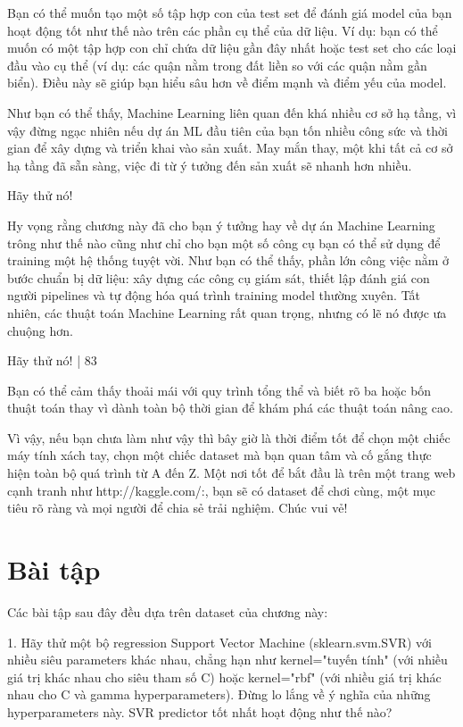 Bạn có thể muốn tạo một số tập hợp con của test set để đánh giá model của bạn hoạt động tốt như thế nào trên các phần cụ thể của dữ liệu. Ví dụ: bạn có thể muốn có một tập hợp con chỉ chứa dữ liệu gần đây nhất hoặc test set cho các loại đầu vào cụ thể (ví dụ: các quận nằm trong đất liền so với các quận nằm gần biển). Điều này sẽ giúp bạn hiểu sâu hơn về điểm mạnh và điểm yếu của model.

Như bạn có thể thấy, Machine Learning liên quan đến khá nhiều cơ sở hạ tầng, vì vậy đừng ngạc nhiên nếu dự án ML đầu tiên của bạn tốn nhiều công sức và thời gian để xây dựng và triển khai vào sản xuất. May mắn thay, một khi tất cả cơ sở hạ tầng đã sẵn sàng, việc đi từ ý tưởng đến sản xuất sẽ nhanh hơn nhiều.

Hãy thử nó!

Hy vọng rằng chương này đã cho bạn ý tưởng hay về dự án Machine Learning trông như thế nào cũng như chỉ cho bạn một số công cụ bạn có thể sử dụng để training một hệ thống tuyệt vời. Như bạn có thể thấy, phần lớn công việc nằm ở bước chuẩn bị dữ liệu: xây dựng các công cụ giám sát, thiết lập đánh giá con người pipelines và tự động hóa quá trình training model thường xuyên. Tất nhiên, các thuật toán Machine Learning rất quan trọng, nhưng có lẽ nó được ưa chuộng hơn.

Hãy thử nó! | 83

Bạn có thể cảm thấy thoải mái với quy trình tổng thể và biết rõ ba hoặc bốn thuật toán thay vì dành toàn bộ thời gian để khám phá các thuật toán nâng cao.

Vì vậy, nếu bạn chưa làm như vậy thì bây giờ là thời điểm tốt để chọn một chiếc máy tính xách tay, chọn một chiếc dataset mà bạn quan tâm và cố gắng thực hiện toàn bộ quá trình từ A đến Z. Một nơi tốt để bắt đầu là trên một trang web cạnh tranh như http://kaggle.com/:, bạn sẽ có dataset để chơi cùng, một mục tiêu rõ ràng và mọi người để chia sẻ trải nghiệm. Chúc vui vẻ!

\section{Bài tập}

Các bài tập sau đây đều dựa trên dataset của chương này:

1. Hãy thử một bộ regression Support Vector Machine (sklearn.svm.SVR) với nhiều siêu parameters khác nhau, chẳng hạn như kernel="tuyến tính" (với nhiều giá trị khác nhau cho siêu tham số C) hoặc kernel="rbf" (với nhiều giá trị khác nhau cho C và gamma hyperparameters). Đừng lo lắng về ý nghĩa của những hyperparameters này. SVR predictor tốt nhất hoạt động như thế nào?

